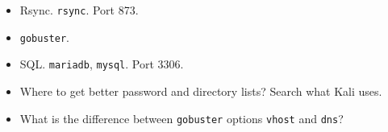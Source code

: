 \documentclass[a4paper,10pt]{article}
\begin{document}
\begin{itemize}
\item Rsync. \texttt{rsync}. Port 873.

\item \texttt{gobuster}.

\item SQL. \texttt{mariadb}, \texttt{mysql}. Port 3306.

\item Where to get better password and directory lists? Search what Kali uses.

\item What is the difference between \texttt{gobuster} options \texttt{vhost} and \texttt{dns}?
\end{itemize}
\end{document}
